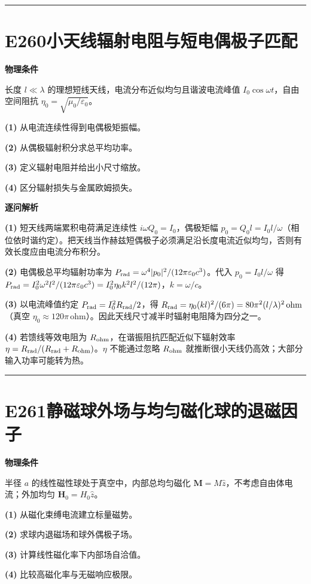 \documentclass[UTF8,a4paper,11pt,oneside,openany]{ctexbook}
\begin{document}
\par\bigskip\hrule\bigskip
\section*{E260\quad 小天线辐射电阻与短电偶极子匹配}
\textbf{物理条件}\par 长度 \(l\ll\lambda\) 的理想短线天线，电流分布近似均匀且谐波电流峰值 \(I_0\cos\omega t\)，自由空间阻抗 \(\eta_0=\sqrt{\mu_0/\varepsilon_0}\)。
\par\noindent\textbf{(1)} 从电流连续性得到电偶极矩振幅。
\par\noindent\textbf{(2)} 从偶极辐射积分求总平均功率。
\par\noindent\textbf{(3)} 定义辐射电阻并给出小尺寸缩放。
\par\noindent\textbf{(4)} 区分辐射损失与金属欧姆损失。

\par\medskip\noindent\textbf{逐问解析}
\par\noindent\textbf{(1)} 短天线两端累积电荷满足连续性 \(i\omega Q_0=I_0\)，偶极矩幅 \(p_0=Q_0l=I_0l/\omega\)（相位依时谐约定）。把天线当作赫兹短偶极子必须满足沿长度电流近似均匀，否则有效长度应由电流分布积分。
\par\noindent\textbf{(2)} 电偶极总平均辐射功率为 \(P_{\rm rad}=\omega^4|p_0|^2/(12\pi\varepsilon_0c^3)\)。代入 \(p_0=I_0l/\omega\) 得 \(P_{\rm rad}=I_0^2\omega^2l^2/(12\pi\varepsilon_0c^3)=I_0^2\eta_0k^2l^2/(12\pi)\)，\(k=\omega/c\)。
\par\noindent\textbf{(3)} 以电流峰值约定 \(P_{\rm rad}=I_0^2R_{\rm rad}/2\)，得 \(R_{\rm rad}=\eta_0(k l)^2/(6\pi)=80\pi^2(l/\lambda)^2\,\mathrm{ohm}\)（真空 \(\eta_0\approx120\pi\,\mathrm{ohm}\)）。因此天线尺寸减半时辐射电阻降为四分之一。
\par\noindent\textbf{(4)} 若馈线等效电阻为 \(R_{\rm ohm}\)，在谐振阻抗匹配近似下辐射效率 \(\eta=R_{\rm rad}/(R_{\rm rad}+R_{\rm ohm})\)。\(\eta\) 不能通过忽略 \(R_{\rm ohm}\) 就推断很小天线仍高效；大部分输入功率可能转为热。

\par\bigskip\hrule\bigskip
\section*{E261\quad 静磁球外场与均匀磁化球的退磁因子}
\textbf{物理条件}\par 半径 \(a\) 的线性磁性球处于真空中，内部总均匀磁化 \(\boldsymbol M=M\hat z\)，不考虑自由体电流；外加均匀 \(\boldsymbol H_0=H_0\hat z\)。
\par\noindent\textbf{(1)} 从磁化束缚电流建立标量磁势。
\par\noindent\textbf{(2)} 求球内退磁场和球外偶极子场。
\par\noindent\textbf{(3)} 计算线性磁化率下内部场自洽值。
\par\noindent\textbf{(4)} 比较高磁化率与无磁响应极限。
\end{document}
